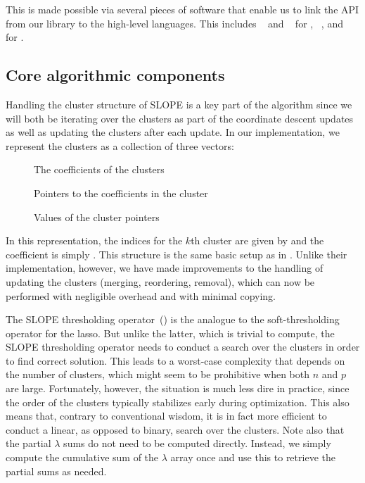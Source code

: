 \documentclass[article]{jss}
\let\Cref\crtCref
\begin{document}
This is made possible via several pieces of software that enable us to link the
API from our  library to the high-level languages. This includes
~\citep{eddelbuettel2011} and ~\citep{bates2013} for
, ~\citep{jakob2025}, and ~\citep{janssens2020} for
.

\subsection{Core algorithmic components}

Handling the cluster structure of SLOPE is a key part of the algorithm since we
will both be iterating over the clusters as part of the coordinate descent
updates as well as updating the clusters after each update. In our
implementation, we represent the clusters as a collection of three vectors:

\begin{description}
  \item[] The coefficients of the clusters
  \item[] Pointers to the coefficients in the cluster
  \item[] Values of the cluster pointers
\end{description}

In this representation, the indices for the \(k\)th cluster are given by  and the coefficient is simply .
This structure is the same basic setup as in \citet{larsson2023}. Unlike
their implementation, however, we have made improvements to the
handling of updating the clusters (merging,
reordering, removal), which can now be performed with negligible
overhead and with minimal copying.

The SLOPE thresholding operator~(\Cref{fig:slope-thresholding}) is the analogue
to the soft-thresholding operator for the lasso. But unlike the latter, which
is trivial to compute, the SLOPE thresholding operator needs to conduct a
search over the clusters in order to find correct solution. This leads to a
worst-case complexity that depends on the number of clusters, which might seem
to be prohibitive when both \(n\) and \(p\) are large. Fortunately, however,
the situation is much less dire in practice, since the order of the clusters
typically stabilizes early during optimization. This also means that, contrary
to conventional wisdom, it is in fact more efficient to conduct a linear, as opposed
to binary, search over the clusters. Note also that the partial \(\lambda\) sums
do not need to be computed directly. Instead, we simply compute the
cumulative sum of the \(\lambda\) array once and use this to retrieve
the partial sums as needed.
\end{document}
